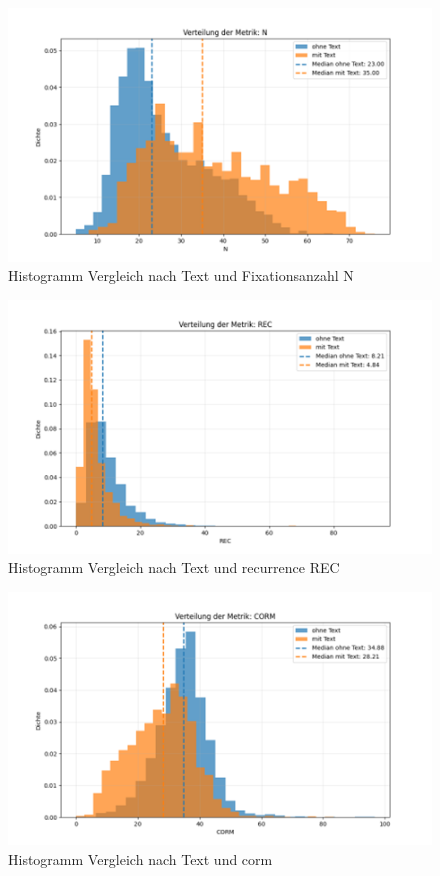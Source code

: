 \documentclass[
    language=german, %
    thesis=seminar, %
    supervisor=postdoc, %
    multiauthor=true, %
    ]{settings/csssa-thesis}
\begin{document}
\begin{figure}[h]
    \centering
    \includegraphics[width=\linewidth,height=0.8\textheight,keepaspectratio]{figures/Bild18.png}
    \caption{Histogramm Vergleich nach Text und Fixationsanzahl N}\label{fig:bild15}
\end{figure}
\begin{figure}[h]
    \centering
    \includegraphics[width=\linewidth,height=0.8\textheight,keepaspectratio]{figures/Bild19.png}
    \caption{Histogramm Vergleich nach Text und recurrence REC}\label{fig:bild16}
\end{figure}
\begin{figure}[h]
    \centering
    \includegraphics[width=\linewidth,height=0.8\textheight,keepaspectratio]{figures/Bild20.png}
    \caption{Histogramm Vergleich nach Text und corm}\label{fig:bild17}
\end{figure}
\end{document}
